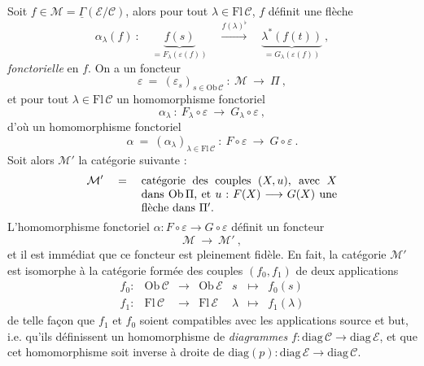 \documentclass[11pt]{article}
\newcommand{\printedpage}[1]{\marginpar{\footnotesize p.~#1}}
\newcommand{\msp}[1]{\marginpar{\footnotesize [#1]}}
\newcommand{\uGamma}{\underline{\Gamma}}
\newcommand{\Ob}{\mathrm{Ob}\,}
\newcommand{\Fl}{\mathrm{Fl}\,}
\newcommand{\diag}{\mathrm{diag}\,}
\begin{document}
Soit $f \in \mathcal{M} = \uGamma(\mathcal{E}/\mathcal{C})$, alors pour tout $\lambda \in \Fl\mathcal{C}$, $f$ définit une flèche
\[
\alpha_\lambda(f) \ : \quad \underbrace{f(s)}_{= F_\lambda(\varepsilon(f))} \quad \xrightarrow{f(\lambda)^\flat} \quad \underbrace{\lambda^*(f(t))}_{= G_\lambda(\varepsilon(f))} \ ,
\]
\textit{fonctorielle} en $f$. On a un foncteur
\[
\varepsilon \ = \ (\varepsilon_s)_{s\in\Ob\mathcal{C}} \ : \ \mathcal{M} \ \longrightarrow \ \Pi \ ,
\]
et pour tout $\lambda \in \Fl\mathcal{C}$ un homomorphisme fonctoriel
\[
\alpha_\lambda \ : \ F_\lambda \circ \varepsilon \ \longrightarrow \ G_\lambda \circ \varepsilon \ ,
\]
d’où un homomorphisme fonctoriel
\[
\alpha \ = \ (\alpha_\lambda)_{\lambda\in\Fl\mathcal{C}} \ : \ F \circ \varepsilon \ \longrightarrow \ G \circ \varepsilon \ .
\]
Soit alors $\mathcal{M}'$ la catégorie suivante :
\printedpage{153}
\msp{page 403}
\[
\mathcal{M}' \quad = \quad \parbox[t]{0.5\textwidth}{catégorie des couples $(X,u)$, avec $X$ dans $\Ob\Pi$, et $u : F(X) \longrightarrow G(X)$ une flèche dans $\Pi'$.}
\]
L’homomorphisme fonctoriel $\alpha : F \circ \varepsilon \longrightarrow G \circ \varepsilon$ définit un foncteur
\[
\mathcal{M} \ \longrightarrow \ \mathcal{M}' \ ,
\]
et il est immédiat que ce foncteur est pleinement fidèle. En fait, la catégorie $\mathcal{M}'$ est isomorphe à la catégorie formée des couples $(f_0,f_1)$ de deux applications
\[
\begin{array}{lcccccc}
f_0 : & \Ob\mathcal{C} & \longrightarrow & \Ob\mathcal{E} & s & \longmapsto & f_0(s)\\[1ex]
f_1 : & \Fl\mathcal{C} & \longrightarrow & \Fl\mathcal{E} & \lambda & \longmapsto & f_1(\lambda)
\end{array}
\]
de telle façon que $f_1$ et $f_0$ soient compatibles avec les applications source et but, i.e. qu’ils définissent un homomorphisme de \textit{diagrammes} $f : \diag\mathcal{C} \longrightarrow \diag\mathcal{E}$, et que cet homomorphisme soit inverse à droite de $\mathrm{diag}(p) : \diag\mathcal{E} \longrightarrow \diag\mathcal{C}$.
\end{document}
